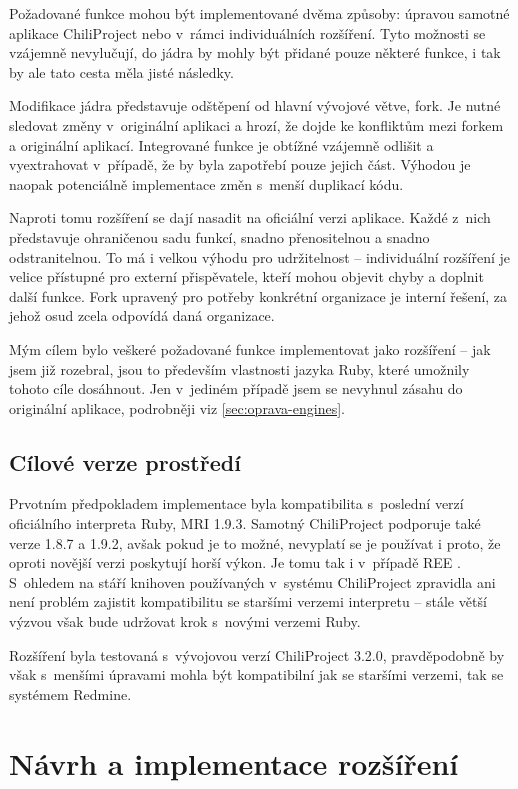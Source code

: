 \documentclass[thesis=B,czech]{FITthesis}[2012/05/02]
\begin{document}
Požadované funkce mohou být implementované dvěma způsoby: úpravou
samotné aplikace ChiliProject nebo v~rámci individuálních rozšíření.
Tyto možnosti se vzájemně nevylučují, do jádra by mohly být přidané
pouze některé funkce, i tak by ale tato cesta měla jisté následky.

Modifikace jádra představuje odštěpení od hlavní vývojové větve,
\gls{fork}. Je nutné sledovat změny v~originální aplikaci a hrozí, že
dojde ke konfliktům mezi forkem a originální aplikací. Integrované
funkce je obtížné vzájemně odlišit a vyextrahovat v~případě, že by byla
zapotřebí pouze jejich část. Výhodou je naopak potenciálně 
implementace změn s~menší duplikací kódu.

Naproti tomu rozšíření se dají nasadit na oficiální verzi aplikace.
Každé z~nich představuje ohraničenou sadu funkcí, snadno přenositelnou a
snadno odstra\-nitelnou. To má i velkou výhodu pro udržitelnost --
individuální rozšíření je velice přístupné pro externí přispěvatele,
kteří mohou objevit chyby a doplnit další funkce. Fork upravený pro
potřeby konkrétní organizace je interní řešení, za jehož osud zcela
odpovídá daná organizace.

Mým cílem bylo veškeré požadované funkce implementovat jako rozšíření --
jak jsem již rozebral, jsou to především vlastnosti jazyka Ruby, které
umožnily tohoto cíle dosáhnout. Jen v~jediném případě jsem se nevyhnul
zásahu do originální aplikace, podrobněji viz
\ref{sec:oprava-engines}.

\section{Cílové verze prostředí}

Prvotním předpokladem implementace byla kompatibilita s~poslední verzí
oficiálního interpreta Ruby, \gls{MRI} 1.9.3. Samotný ChiliProject
podporuje také verze 1.8.7 a 1.9.2, avšak pokud je to možné, nevyplatí se
je používat i proto, že oproti novější verzi poskytují horší výkon. Je tomu
tak i v~případě \gls{REE} \citep[End of Life]{REEEOL}. S~ohledem na stáří
knihoven používaných v~systému ChiliProject zpravidla ani není problém
zajistit kompatibilitu se staršími verzemi interpretu -- stále větší
výzvou však bude udržovat krok s~novými verzemi Ruby.

Rozšíření byla testovaná s~vývojovou verzí ChiliProject 3.2.0,
pravděpodobně by však s~menšími úpravami mohla být kompatibilní jak se
staršími verzemi, tak se systémem Redmine.

\chapter{Návrh a implementace rozšíření}
\end{document}
